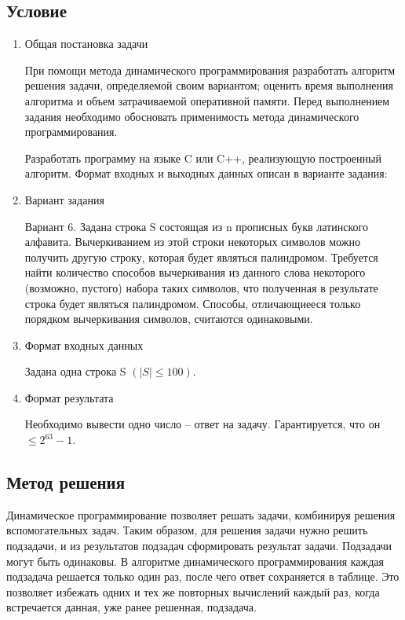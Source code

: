 \documentclass[12pt]{article}
\begin{document}
\subsection*{Условие}
\begin{enumerate}
\item Общая постановка задачи 

При помощи метода динамического программирования разработать алгоритм решения задачи, определяемой своим вариантом; оценить время выполнения алгоритма и объем затрачиваемой оперативной памяти. Перед выполнением задания необходимо обосновать применимость метода динамического программирования.

Разработать программу на языке C или C++, реализующую построенный алгоритм. Формат входных и выходных данных описан в варианте задания:

\item Вариант задания 

Вариант 6. Задана строка S состоящая из n прописных букв латинского алфавита. Вычеркиванием из этой строки некоторых символов можно получить другую строку, которая будет являться палиндромом. Требуется найти количество способов вычеркивания из данного слова некоторого (возможно, пустого) набора таких символов, что полученная в результате строка будет являться палиндромом. Способы, отличающиееся только порядком вычеркивания символов, считаются одинаковыми.

\item Формат входных данных

Задана одна строка S $(|S| \leq 100)$.

\item Формат результата

Необходимо вывести одно число – ответ на задачу. Гарантируется, что он $\leq 2^{63} - 1$.

\end{enumerate}

\subsection*{Метод решения}

Динамическое программирование позволяет решать задачи, комбинируя решения вспомогательных задач. Таким образом, для решения задачи нужно решить подзадачи, и из результатов подзадач сформировать результат задачи. Подзадачи могут быть одинаковы. В алгоритме динамического программирования каждая подзадача решается только один раз, после чего ответ сохраняется в таблице. Это позволяет избежать одних и тех же повторных вычислений каждый раз, когда встречается данная, уже ранее решенная, подзадача. 
\end{document}
